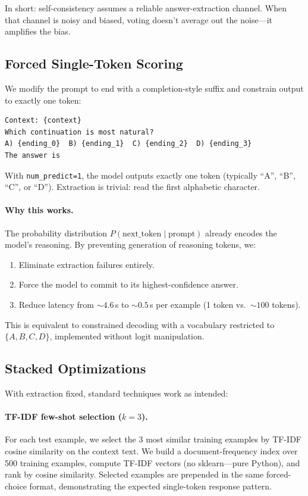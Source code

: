 \documentclass[11pt]{article}
\begin{document}
In short: self-consistency assumes a reliable answer-extraction channel. When that channel is noisy and biased, voting doesn't average out the noise---it amplifies the bias.

\subsection{Forced Single-Token Scoring}

We modify the prompt to end with a completion-style suffix and constrain output to exactly one token:

\begin{verbatim}
Context: {context}
Which continuation is most natural?
A) {ending_0}  B) {ending_1}  C) {ending_2}  D) {ending_3}
The answer is
\end{verbatim}

With \texttt{num\_predict=1}, the model outputs exactly one token (typically ``A'', ``B'', ``C'', or ``D''). Extraction is trivial: read the first alphabetic character.

\paragraph{Why this works.} The probability distribution $P(\text{next\_token} \mid \text{prompt})$ already encodes the model's reasoning. By preventing generation of reasoning tokens, we:
\begin{enumerate}
    \item Eliminate extraction failures entirely.
    \item Force the model to commit to its highest-confidence answer.
    \item Reduce latency from ${\sim}4.6$\,s to ${\sim}0.5$\,s per example (1 token vs.\ ${\sim}100$ tokens).
\end{enumerate}

This is equivalent to constrained decoding with a vocabulary restricted to $\{A, B, C, D\}$, implemented without logit manipulation.

\subsection{Stacked Optimizations}

With extraction fixed, standard techniques work as intended:

\paragraph{TF-IDF few-shot selection ($k{=}3$).}
For each test example, we select the 3 most similar training examples by TF-IDF cosine similarity on the context text. We build a document-frequency index over 500 training examples, compute TF-IDF vectors (no sklearn---pure Python), and rank by cosine similarity. Selected examples are prepended in the same forced-choice format, demonstrating the expected single-token response pattern.
\end{document}
